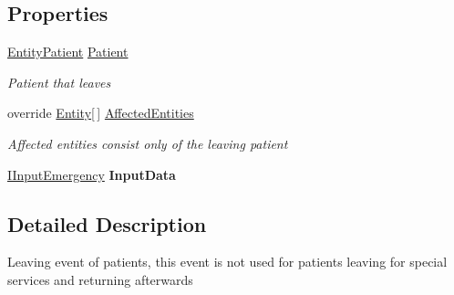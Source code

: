 \subsection*{Properties}
\begin{DoxyCompactItemize}
\item 
\hyperlink{class_general_health_care_elements_1_1_entities_1_1_entity_patient}{Entity\+Patient} \hyperlink{class_general_health_care_elements_1_1_department_models_1_1_emergency_1_1_event_emergency_patient_leave_a017d5d979a92db776957e2cb10223a2d}{Patient}
\begin{DoxyCompactList}\small\item\em Patient that leaves \end{DoxyCompactList}\item 
override \hyperlink{class_simulation_core_1_1_h_c_c_m_elements_1_1_entity}{Entity}\mbox{[}$\,$\mbox{]} \hyperlink{class_general_health_care_elements_1_1_department_models_1_1_emergency_1_1_event_emergency_patient_leave_ad4518aba192cbebb17419e0780389b5b}{Affected\+Entities}
\begin{DoxyCompactList}\small\item\em Affected entities consist only of the leaving patient \end{DoxyCompactList}\item 
\hyperlink{interface_general_health_care_elements_1_1_department_models_1_1_emergency_1_1_i_input_emergency}{I\+Input\+Emergency} {\bfseries Input\+Data}\hypertarget{class_general_health_care_elements_1_1_department_models_1_1_emergency_1_1_event_emergency_patient_leave_ad9dbe1f35a7f5cf626e05b032f98fe69}{}\label{class_general_health_care_elements_1_1_department_models_1_1_emergency_1_1_event_emergency_patient_leave_ad9dbe1f35a7f5cf626e05b032f98fe69}

\end{DoxyCompactItemize}


\subsection{Detailed Description}
Leaving event of patients, this event is not used for patients leaving for special services and returning afterwards 



